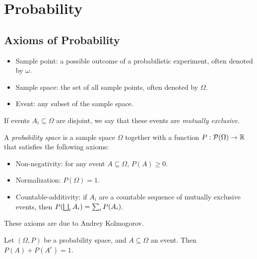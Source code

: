 \chapter{Probability}
\label{ch:probability}

\section{Axioms of Probability}

\begin{defn}\proofbreak
    \begin{itemize}
        \item Sample point: a possible outcome of a probabilistic experiment, often denoted by $\omega$.
        \item Sample space: the set of all sample points, often denoted by $\Omega$.
        \item Event: any subset of the sample space.
    \end{itemize}
\end{defn}

\begin{defn}
    If events $A_i \subseteq \Omega$ are disjoint, we say that these events are \emph{mutually exclusive}.
\end{defn}

\begin{defn}\label{kolmogorov-probability-axioms}
    A \emph{probability space} is a sample space $\Omega$ together with a function $P: \mathcal{P}(\Omega) \to \mathbb{R}$ that satisfies the following axioms:
    \begin{itemize}
        \item Non-negativity: for any event $A \subseteq \Omega$, $P(A) \geq 0$.
        \item Normalization: $P(\Omega) = 1$.
        \item Countable-additivity: if $A_i$ are a countable sequence of mutually exclusive events, then $P(\bigsqcup_{i}A_i) = \sum_{i}P(A_i)$.
    \end{itemize}
\end{defn}

\begin{rmk}
    These axioms are due to Andrey Kolmogorov.
\end{rmk}

\begin{prop}
    Let $(\Omega, P)$ be a probability space, and $A \subseteq \Omega$ an event. Then $P(A) + P(A^{c}) = 1$.
\end{prop}


